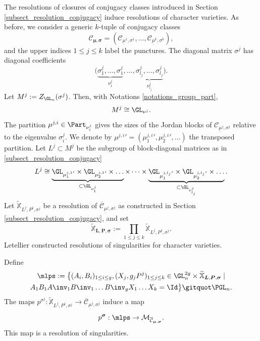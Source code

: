 The resolutions of closures of conjugacy classes introduced in Section \ref{subsect_resolution_conjugacy} induce resolutions of character varieties. As before, we consider a generic $k$-tuple of conjugacy classes
\[
\mathcal{C}_{\boldsymbol{\mu},\boldsymbol{\sigma}} =(\mathcal{C}_{\underline{\mu}^1,\sigma^1}, \dots, \mathcal{C}_{\underline{\mu}^k,\sigma^k}),
\]
and the upper indices $1\le j \le k$ label the punctures. The diagonal matrix $\sigma^j$ has diagonal coefficients
\[
\bigl(\underbrace{\sigma^j_1,\dots,\sigma^j_{1}}_{\nu^j_1},\dots, \underbrace{\sigma^j_{l_j},\dots,\sigma^j_{l_j}}_{\nu^j_{l_j}}\bigl).
\]
Let $M^j:= Z_{\GL_n} (\sigma^j)$. Then, with Notations \ref{notations_group_part},
\[
M^j\cong \GL_{\nu^j}.
\]
The partition $\mu^{j,i}\in \Part_{\nu^{j}_i}$ gives the sizes of the Jordan blocks of $\mathcal{C}_{\underline{\mu}^j,\sigma^j}$ relative to the eigenvalue $\sigma^j_i$. We denote by ${\mu^{j,i}}'=({\mu^{j,i}_1}',{\mu^{j,i}_2}',\dots)$ the transposed partition. Let $L^j\subset M^j$ be the subgroup of block-diagonal matrices as in \ref{subsect_resolution_conjugacy}
\[
L^j \cong \underbrace{\GL_{{\mu^{j,1}_1}'}\times \GL_{{\mu^{j,1}_2}'} \times \dots }_{\subset \GL_{\nu^j_1}}\times \dots \times \underbrace{\GL_{{\mu^{j,l_j}_1}'}\times \GL_{{\mu^{j,l_j}_2}'} \times \dots}_{\subset \GL_{\nu^j_{l_j}}}.
\]
Let $\mathbb{\widetilde{X}}_{L^j,P^j,\sigma^j}$ be a resolution of $\overline{\mathcal{C}}_{\underline{\mu}^j,\sigma^j}$ as constructed in Section \ref{subsect_resolution_conjugacy}, and set
\[
\mathbb{\widetilde{X}}_{\boldsymbol{L},\boldsymbol{P},\boldsymbol{\sigma}} := \prod_{1\le j\le k} \mathbb{\widetilde{X}}_{L^j,P^j,\sigma^j}.
\]
Letellier \cite{Letellier13} constructed resolutions of singularities for character varieties.
\begin{definition}\label{def_resol_char}
Define
\begin{multline}
\mlps := \bigl\lbrace(A_i, B_i)_{1\le i \le g}, (X_j, g_j P^j)_{1\le j \le k} \in \GL_n^{2 g}\times \mathbb{\widetilde{X}}_{\boldsymbol{L},\boldsymbol{P},\boldsymbol{\sigma}}\mid\\
A_1 B_1 A\inv_1 B\inv_1 \dots B\inv_g X_1\dots X_k = \Id\bigr\rbrace\gitquot\PGL_n.
\end{multline}
The maps $p^{\sigma^j} : \mathbb{\widetilde{X}}_{L^j,P^j,\sigma^j} \to \overline{\mathcal{C}}_{\underline{\mu}^j,\sigma^j}$ induce a map
\[
p^{\boldsymbol{\sigma}} : \mlps \to \mathcal{M}_{\overline{\mathcal{C}}_{\boldsymbol{\mu},\boldsymbol{\sigma}}}.
\]
This map is a resolution of singularities.
\end{definition}

